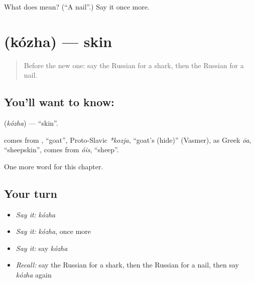\begin{tcolorbox}[breakable,colback=teal!4,colframe=teal!35!black,title={Before you move on}]
What does  mean? (\textquotedblleft{}A nail\textquotedblright{}.) Say it once more.
\end{tcolorbox}
\section[\texorpdfstring{\ru{кожа} (kózha)}{кожа (kózha)}]{ (kózha) — skin}

\label{lesson:RU-C121-skin}



\begin{quote}
Before the new one: say the Russian for a shark, then the Russian for a nail.
\end{quote}

\subsection*{You'll want to know: }
\textbf{} (\emph{kózha}) — \textquotedblleft{}skin\textquotedblright{}.

\begin{cousinweb}
\textbf{} comes from \emph{}, \textquotedblleft{}goat\textquotedblright{}, Proto-Slavic \emph{*kozja}, \textquotedblleft{}goat's (hide)\textquotedblright{} (Vasmer), as Greek \emph{ōa}, \textquotedblleft{}sheepskin\textquotedblright{}, comes from \emph{óis}, \textquotedblleft{}sheep\textquotedblright{}.
\end{cousinweb}

\begin{grammarlens}[title={What you've built}]
One more word for this chapter.
\end{grammarlens}

\subsection*{Your turn}
\begin{itemize}
\raggedright
  \item \emph{Say it:} \emph{kózha}
  \item \emph{Say it:} \emph{kózha}, once more
  \item \emph{Say it:} say \emph{kózha}
  \item \emph{Recall:} say the Russian for a shark, then the Russian for a nail, then say \emph{kózha} again
\end{itemize}

